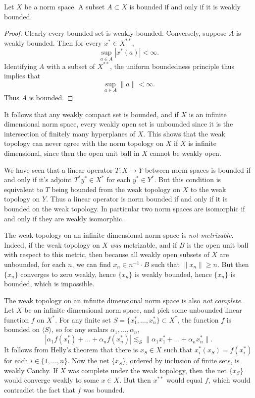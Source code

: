 \begin{theorem}
    Let $X$ be a norm space. A subset $A \subset X$ is bounded if and only if it is weakly bounded.
\end{theorem}
\begin{proof}
    Clearly every bounded set is weakly bounded. Conversely, suppose $A$ is weakly bounded. Then for every $x^* \in X^{**}$,
    \[ \sup_{a \in A} |x^*(a)| < \infty. \]
    Identifying $A$ with a subset of $X^{**}$, the uniform boundedness principle thus implies that
    \[ \sup_{a \in A} \| a \| < \infty. \]
    Thus $A$ is bounded.
\end{proof}

It follows that any weakly compact set is bounded, and if $X$ is an infinite dimensional norm space, every weakly open set is unbounded since it is the intersection of finitely many hyperplanes of $X$. This shows that the weak topology can never agree with the norm topology on $X$ if $X$ is infinite dimensional, since then the open unit ball in $X$ cannot be weakly open.

We have seen that a linear operator $T: X \to Y$ between norm spaces is bounded if and only if it's adjoint $T^* y^* \in X^*$ for each $y^* \in Y^*$. But this condition is equivalent to $T$ being bounded from the weak topology on $X$ to the weak topology on $Y$. Thus a linear operator is norm bounded if and only if it is bounded on the weak topology. In particular two norm spaces are isomorphic if and only if they are weakly isomorphic.

The weak topology on an infinite dimensional norm space is \emph{not metrizable}. Indeed, if the weak topology on $X$ \emph{was} metrizable, and if $B$ is the open unit ball with respect to this metric, then because all weakly open subsets of $X$ are unbounded, for each $n$, we can find $x_n \in n^{-1} \cdot B$ such that $\| x_n \| \geq n$. But then $\{ x_n \}$ converges to zero weakly, hence $\{ x_n \}$ is weakly bounded, hence $\{ x_n \}$ is bounded, which is impossible.

The weak topology on an infinite dimensional norm space is also \emph{not complete}. Let $X$ be an infinite dimensional norm space, and pick some unbounded linear function $f$ on $X^*$. For any finite set $S = \{ x_1^*, \dots, x_n^* \} \subset X^*$, the function $f$ is bounded on $\langle S \rangle$, so for any scalars $\alpha_1,\dots,\alpha_n$,
%
\[ |\alpha_1 f(x_1^*) + \dots + \alpha_n f(x_n^*)| \lesssim_S \| \alpha_1 x_1^* + \dots + \alpha_n x_n^* \|. \]
%
It follows from Helly's theorem that there is $x_S \in X$ such that $x_i^*(x_S) = f(x_i^*)$ for each $i \in \{ 1, \dots, n \}$. Now the net $\{ x_S \}$, ordered by inclusion of finite sets, is weakly Cauchy. If $X$ was complete under the weak topology, then the net $\{ x_S \}$ would converge weakly to some $x \in X$. But then $x^{**}$ would equal $f$, which would contradict the fact that $f$ was bounded.

